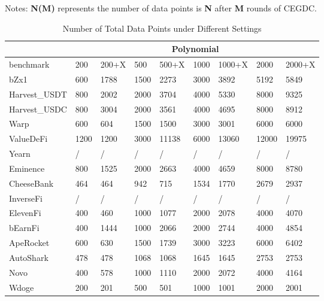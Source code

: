 \begin{table}[thbp]
    \caption{Number of Total Data Points under Different Settings}
    {\raggedright Notes: 
    \textbf{N(M)} represents the number of data points is \textbf{N} after \textbf{M} rounds of CEGDC. 
    \par}

    \centering
    \begin{tabular}{|l|llllllll|}
        \hline
                        &      \multicolumn{8}{c|}{Polynomial}                         \\ \hline
        benchmark         & 200  & 200+X & 500  & 500+X & 1000 & 1000+X & 2000  & 2000+X  \\ \hline
        bZx1              & 600  & 1788  & 1500 & 2273  & 3000 & 3892   & 5192  & 5849    \\
        Harvest\_USDT     & 800  & 2002  & 2000 & 3704  & 4000 & 5330   & 8000  & 9325    \\
        Harvest\_USDC     & 800  & 3004  & 2000 & 3561  & 4000 & 4695   & 8000  & 8912    \\
        Warp              & 600  & 604   & 1500 & 1500  & 3000 & 3001   & 6000  & 6000    \\
        ValueDeFi         & 1200 & 1200  & 3000 & 11138 & 6000 & 13060  & 12000 & 19975   \\
        Yearn             & /    & /     & /    & /     & /    & /      & /     & /       \\
        Eminence          & 800  & 1525  & 2000 & 2663  & 4000 & 4659   & 8000  & 8780    \\
        CheeseBank        & 464  & 464   & 942  & 715   & 1534 & 1770   & 2679  & 2937    \\
        InverseFi         & /    & /     & /    & /     & /    & /      & /     & /       \\
        ElevenFi          & 400  & 460   & 1000 & 1077  & 2000 & 2078   & 4000  & 4070    \\
        bEarnFi           & 400  & 1444  & 1000 & 2066  & 2000 & 2744   & 4000  & 4854    \\
        ApeRocket         & 600  & 630   & 1500 & 1739  & 3000 & 3223   & 6000  & 6402    \\
        AutoShark         & 478  & 478   & 1068 & 1068  & 1645 & 1645   & 2753  & 2753    \\
        Novo              & 400  & 578   & 1000 & 1110  & 2000 & 2072   & 4000  & 4164    \\
        Wdoge             & 200  & 201   & 500  & 501   & 1000 & 1001   & 2000  & 2001    \\

\end{tabular}
\end{table}
